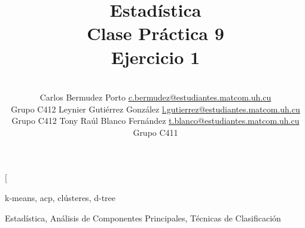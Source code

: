 \documentclass[a4paper,10pt,twocolumn]{article}
\title{Estadística\\Clase Práctica 9\\Ejercicio 1}
\author{\\
	\name Carlos Bermudez Porto \email \href{mailto:c.bermudez@estudiantes.matcom.uh.cu}{c.bermudez@estudiantes.matcom.uh.cu}
	\\ \addr Grupo C412 \AND
	\name Leynier Gutiérrez González \email \href{mailto:l.gutierrez@estudiantes.matcom.uh.cu}{l.gutierrez@estudiantes.matcom.uh.cu}
	\\ \addr Grupo C412 \AND
	\name Tony Raúl Blanco Fernández \email \href{mailto:t.blanco@estudiantes.matcom.uh.cu}{t.blanco@estudiantes.matcom.uh.cu}
	\\ \addr Grupo C411}
\begin{document}
	
	\twocolumn[
	
	\maketitle
	
	
	
	
	
	
	
	
	
	\begin{keywords}
		k-means,
		acp,
		clústeres,
		d-tree
	\end{keywords}
	
	\begin{topics}
		Estadística, Análisis de Componentes Principales, Técnicas de Clasificación
	\end{topics}
	
\end{document}
